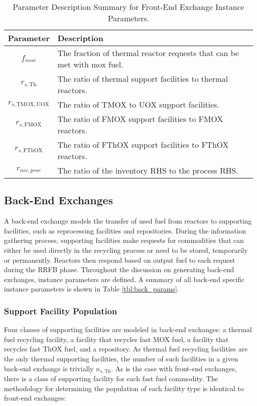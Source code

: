 \begin{table}[h!]
\centering
\caption{Parameter Description Summary for Front-End Exchange Instance Parameters.}
\label{tbl:front_params}
\begin{tabularx}{\columnwidth-10pt}{|c|X|} %
\hline
Parameter    & 
Description
\\ \hline
$f_{mox}$     & 
The fraction of thermal reactor requests that can be met with mox fuel.
\\ \hline
$r_{s, \text{Th}}$ & 
The ratio of thermal support facilities to thermal reactors.  
\\ \hline
$r_{s, \text{TMOX}, \text{UOX}}$ & 
The ratio of TMOX to UOX support facilities.
\\ \hline
$r_{s, \text{FMOX}}$ & 
The ratio of FMOX support facilities to FMOX reactors.
\\ \hline
$r_{s, \text{FThOX}}$ & 
The ratio of FThOX support facilities to FThOX reactors.
\\ \hline
$r_{inv, proc}$   & 
The ratio of the inventory RHS to the process RHS.
\\ \hline
\end{tabularx}
\end{table}

\subsection{Back-End Exchanges}\label{method:setup:back}

A back-end exchange models the transfer of used fuel from reactors to supporting
facilities, such as reprocessing facilities and repositories. During the
information gathering process, supporting facilities make requests for
commodities that can either be used directly in the recycling process or need to
be stored, temporarily or permanently. Reactors then respond based on output
fuel to each request during the RRFB phase. Throughout the discussion on
generating back-end exchanges, instance parameters are defined. A summary of all
back-end specific instance parameters is shown in Table \ref{tbl:back_params}.

\subsubsection{Support Facility Population}\label{method:setup:back:sup}

Four classes of supporting facilities are modeled in back-end exchanges: a
thermal fuel recycling facility, a facility that recycles fast MOX fuel, a
facility that recycles fast ThOX fuel, and a repository. As thermal fuel
recycling facilities are the only thermal supporting facilities, the number of
such facilities in a given back-end exchange is trivially $n_{s, \text{Th}}$. As is the
case with front-end exchanges, there is a class of supporting facility for each
fast fuel commodity. The methodology for determining the population of each
facility type is identical to front-end exchanges:

